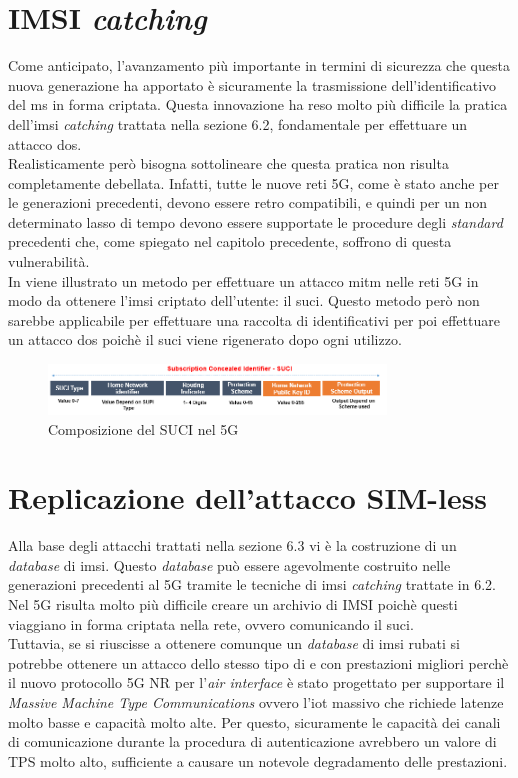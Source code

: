 \section{IMSI \textit{catching}}
Come anticipato, l'avanzamento più importante in termini di sicurezza che questa nuova generazione ha apportato è sicuramente la trasmissione dell'identificativo del \gls{ms} in forma 
criptata. Questa innovazione ha reso molto più difficile la pratica dell'\gls{imsi} \textit{catching} trattata nella sezione 6.2, fondamentale per effettuare un attacco \gls{dos}.\\
Realisticamente però bisogna sottolineare che questa pratica non risulta completamente debellata. Infatti, tutte le nuove reti 5G, come è stato anche per le generazioni precedenti, devono 
essere retro compatibili, e quindi per un non determinato lasso di tempo devono essere supportate le procedure degli \textit{standard} precedenti che, come spiegato nel capitolo precedente, soffrono 
di questa vulnerabilità.\\
In \cite{suci-catch} viene illustrato un metodo per effettuare un attacco \gls{mitm} nelle reti 5G in modo da ottenere l'\gls{imsi} criptato dell'utente: il \gls{suci}. Questo metodo però non sarebbe applicabile per effettuare 
una raccolta di identificativi per poi effettuare un attacco \gls{dos} poichè il \gls{suci} viene rigenerato dopo ogni utilizzo.
\begin{figure}[ht]
    \centering
    \includegraphics[width=0.8\textwidth]{images/5g-suci.png}
    \caption{Composizione del SUCI nel 5G}
\end{figure}

\section{Replicazione dell'attacco SIM-less}
Alla base degli attacchi trattati nella sezione 6.3 vi è la costruzione di un \textit{database} di \gls{imsi}. Questo \textit{database} può essere agevolmente costruito nelle generazioni precedenti al 5G 
tramite le tecniche di \gls{imsi} \textit{catching} trattate in 6.2. Nel 5G risulta molto più difficile creare un archivio di IMSI poichè questi viaggiano in forma criptata nella rete, ovvero comunicando il \gls{suci}.\\
Tuttavia, se si riuscisse a ottenere comunque un \textit{database} di \gls{imsi} rubati si potrebbe ottenere un attacco dello stesso tipo di \cite{gsm-dos-simless} e \cite{umts-dos} con prestazioni migliori 
perchè il nuovo protocollo 5G NR\cite{5g-nr} per l'\textit{air interface} è stato progettato per supportare il \textit{Massive Machine Type Communications} ovvero l'\gls{iot} massivo che richiede latenze molto basse e capacità molto alte.
Per questo, sicuramente le capacità dei canali di comunicazione durante la procedura di autenticazione avrebbero un valore di TPS molto alto, sufficiente a causare un notevole degradamento delle prestazioni.


